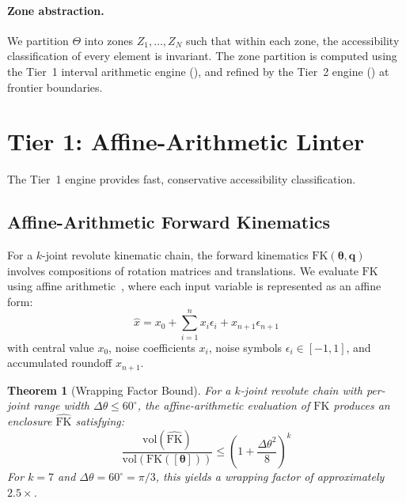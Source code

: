 \documentclass[11pt,letterpaper]{article}
\newtheorem{theorem}{Theorem}[section]
\newcommand{\FK}{\mathrm{FK}}
\newcommand{\param}{\Theta}
\newcommand{\bodyp}{\boldsymbol{\theta}}
\newcommand{\joint}{\mathbf{q}}
\begin{document}
\paragraph{Zone abstraction.}
We partition $\param$ into zones $Z_1, \ldots, Z_N$ such that within each zone, the accessibility classification of every element is invariant.
The zone partition is computed using the Tier~1 interval arithmetic engine (), and refined by the Tier~2 engine () at frontier boundaries.

\section{Tier 1: Affine-Arithmetic Linter}
\label{sec:tier1}

The Tier~1 engine provides fast, conservative accessibility classification.

\subsection{Affine-Arithmetic Forward Kinematics}

For a $k$-joint revolute kinematic chain, the forward kinematics $\FK(\bodyp, \joint)$ involves compositions of rotation matrices and translations.
We evaluate $\FK$ using affine arithmetic~\cite{stolfi1997}, where each input variable is represented as an affine form:
\begin{equation}
\hat{x} = x_0 + \sum_{i=1}^{n} x_i \epsilon_i + x_{n+1} \epsilon_{n+1}
\end{equation}
with central value $x_0$, noise coefficients $x_i$, noise symbols $\epsilon_i \in [-1, 1]$, and accumulated roundoff $x_{n+1}$.

\begin{theorem}[Wrapping Factor Bound]
\label{thm:wrapping}
For a $k$-joint revolute chain with per-joint range width $\Delta\theta \leq 60^\circ$, the affine-arithmetic evaluation of $\FK$ produces an enclosure $\widehat{\FK}$ satisfying:
\begin{equation}
\frac{\mathrm{vol}(\widehat{\FK})}{\mathrm{vol}(\FK([\bodyp]))} \leq \left(1 + \frac{\Delta\theta^2}{8}\right)^k
\end{equation}
For $k = 7$ and $\Delta\theta = 60^\circ = \pi/3$, this yields a wrapping factor of approximately $2.5\times$.
\end{theorem}
\end{document}
